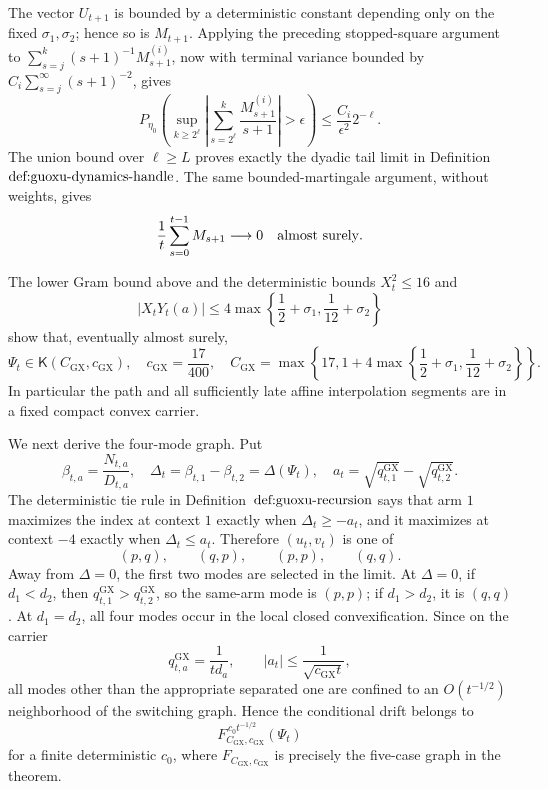 The vector \(U_{t+1}\) is bounded by a deterministic constant depending only on the fixed \(\sigma_1,\sigma_2\); hence so is \(M_{t+1}\).  Applying the preceding stopped-square argument to \(\sum_{s=j}^k(s+1)^{-1}M_{s+1}^{(i)}\), now with terminal variance bounded by \(C_i\sum_{s=j}^{\infty}(s+1)^{-2}\), gives
\[
 P_{\eta_0}\!\left(
 \sup_{k\ge 2^\ell}
 \left|\sum_{s=2^\ell}^{k}\frac{M_{s+1}^{(i)}}{s+1}\right|>\epsilon
 \right)
 \le \frac{C_i}{\epsilon^2}2^{-\ell}.
\]
The union bound over \(\ell\ge L\) proves exactly the dyadic tail limit in Definition~\(\textnormal{def:guoxu-dynamics-handle}\).  The same bounded-martingale argument, without weights, gives
\[
 \frac1t\sum_{s=0}^{t-1}M_{s+1}\longrightarrow0
 \quad\hbox{almost surely}.
\]

The lower Gram bound above and the deterministic bounds \(X_t^2\le16\) and
\[
 |X_tY_t(a)|\le4\max\left\{\frac12+\sigma_1,\frac1{12}+\sigma_2\right\}
\]
show that, eventually almost surely,
\[
 \Psi_t\in\mathsf K(C_{\mathrm{GX}},c_{\mathrm{GX}}),
 \quad
 c_{\mathrm{GX}}=\frac{17}{400},
 \quad
 C_{\mathrm{GX}}=\max\left\{17,
 1+4\max\left\{\frac12+\sigma_1,\frac1{12}+\sigma_2\right\}\right\}.
\]
In particular the path and all sufficiently late affine interpolation segments are in a fixed compact convex carrier.

We next derive the four-mode graph.  Put
\[
 \beta_{t,a}=\frac{N_{t,a}}{D_{t,a}},
 \quad
 \Delta_t=\beta_{t,1}-\beta_{t,2}=\Delta(\Psi_t),
 \quad
 a_t=\sqrt{q^{\mathrm{GX}}_{t,1}}-\sqrt{q^{\mathrm{GX}}_{t,2}}.
\]
The deterministic tie rule in Definition~\(\textnormal{def:guoxu-recursion}\) says that arm \(1\) maximizes the index at context \(1\) exactly when \(\Delta_t\ge-a_t\), and it maximizes at context \(-4\) exactly when \(\Delta_t\le a_t\).  Therefore \((u_t,v_t)\) is one of
\[
 (p,q),\qquad(q,p),\qquad(p,p),\qquad(q,q).
\]
Away from \(\Delta=0\), the first two modes are selected in the limit.  At \(\Delta=0\), if \(d_1<d_2\), then \(q^{\mathrm{GX}}_{t,1}>q^{\mathrm{GX}}_{t,2}\), so the same-arm mode is \((p,p)\); if \(d_1>d_2\), it is \((q,q)\).  At \(d_1=d_2\), all four modes occur in the local closed convexification.  Since on the carrier
\[
 q^{\mathrm{GX}}_{t,a}=\frac1{td_a},
 \qquad
 |a_t|\le \frac1{\sqrt{c_{\mathrm{GX}}t}},
\]
all modes other than the appropriate separated one are confined to an \(O(t^{-1/2})\) neighborhood of the switching graph.  Hence the conditional drift belongs to
\[
 F_{C_{\mathrm{GX}},c_{\mathrm{GX}}}^{\,c_0t^{-1/2}}(\Psi_t)
\]
for a finite deterministic \(c_0\), where \(F_{C_{\mathrm{GX}},c_{\mathrm{GX}}}\) is precisely the five-case graph in the theorem.

